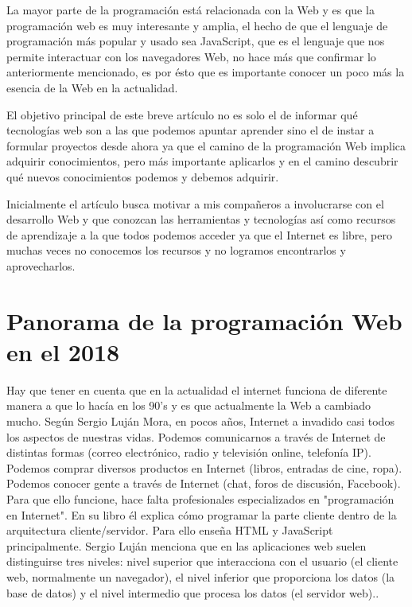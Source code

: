 \documentclass[twocolumns,a4paper]{IEEEtran}
\begin{document}
La mayor parte de la programación está relacionada con la Web y es que la
programación web es muy interesante y amplia, el hecho de que el lenguaje de
programación más popular y usado sea JavaScript, que es el lenguaje que nos
permite interactuar con los navegadores Web, no hace más que confirmar lo
anteriormente mencionado, es por ésto que es importante conocer un poco más la
esencia de la Web en la actualidad.

El objetivo principal de este breve artículo no es solo el de informar qué
tecnologías web son a las que podemos apuntar aprender sino el de instar a
formular proyectos desde ahora ya que el camino de la programación Web implica
adquirir conocimientos, pero más importante aplicarlos y en el camino descubrir
qué nuevos conocimientos podemos y debemos adquirir.

Inicialmente el artículo busca motivar a mis compañeros a involucrarse con el
desarrollo Web y que conozcan las herramientas y tecnologías así como recursos
de aprendizaje a la que todos podemos acceder ya que el Internet es libre, pero
muchas veces no conocemos los recursos y no logramos encontrarlos y
aprovecharlos.

\section{Panorama de la programación Web en el 2018}

Hay que tener en cuenta que en la actualidad el internet funciona de
diferente manera a que lo hacía en los 90's y es que actualmente la Web a
cambiado mucho. Según Sergio Luján Mora, en pocos años, Internet a invadido
casi todos los aspectos de nuestras vidas. Podemos comunicarnos a través de
Internet de distintas formas (correo electrónico, radio y televisión online,
telefonía IP). Podemos comprar diversos productos en Internet (libros,
entradas de cine, ropa). Podemos conocer gente a través de Internet (chat,
foros de discusión, Facebook). Para que ello funcione, hace falta profesionales
especializados en "programación en Internet". En su libro él explica cómo
programar la parte cliente dentro de la arquitectura cliente/servidor. Para
ello enseña HTML y JavaScript principalmente. Sergio Luján menciona que en las
aplicaciones web suelen distinguirse tres niveles: nivel superior que
interacciona con el usuario (el cliente web, normalmente un navegador), el
nivel inferior que proporciona los datos (la base de datos) y el nivel
intermedio que procesa los datos (el servidor web).\cite{SergioLujan2001}.
\newline
\end{document}
